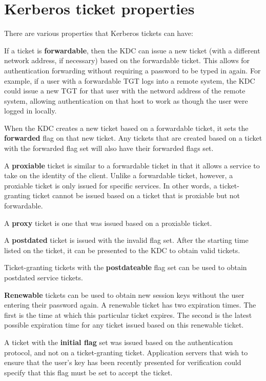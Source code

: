 \documentclass[letterpaper,10pt,english]{sphinxmanual}
\begin{document}
\section{Kerberos ticket properties}
\label{user/tkt_mgmt:kerberos-ticket-properties}
There are various properties that Kerberos tickets can have:

If a ticket is \textbf{forwardable}, then the KDC can issue a new ticket
(with a different network address, if necessary) based on the
forwardable ticket.  This allows for authentication forwarding without
requiring a password to be typed in again.  For example, if a user
with a forwardable TGT logs into a remote system, the KDC could issue
a new TGT for that user with the netword address of the remote system,
allowing authentication on that host to work as though the user were
logged in locally.

When the KDC creates a new ticket based on a forwardable ticket, it
sets the \textbf{forwarded} flag on that new ticket.  Any tickets that are
created based on a ticket with the forwarded flag set will also have
their forwarded flags set.

A \textbf{proxiable} ticket is similar to a forwardable ticket in that it
allows a service to take on the identity of the client.  Unlike a
forwardable ticket, however, a proxiable ticket is only issued for
specific services.  In other words, a ticket-granting ticket cannot be
issued based on a ticket that is proxiable but not forwardable.

A \textbf{proxy} ticket is one that was issued based on a proxiable ticket.

A \textbf{postdated} ticket is issued with the invalid flag set.  After the
starting time listed on the ticket, it can be presented to the KDC to
obtain valid tickets.

Ticket-granting tickets with the \textbf{postdateable} flag set can be used
to obtain postdated service tickets.

\textbf{Renewable} tickets can be used to obtain new session keys without
the user entering their password again.  A renewable ticket has two
expiration times.  The first is the time at which this particular
ticket expires.  The second is the latest possible expiration time for
any ticket issued based on this renewable ticket.

A ticket with the \textbf{initial flag} set was issued based on the
authentication protocol, and not on a ticket-granting ticket.
Application servers that wish to ensure that the user's key has been
recently presented for verification could specify that this flag must
be set to accept the ticket.
\end{document}
